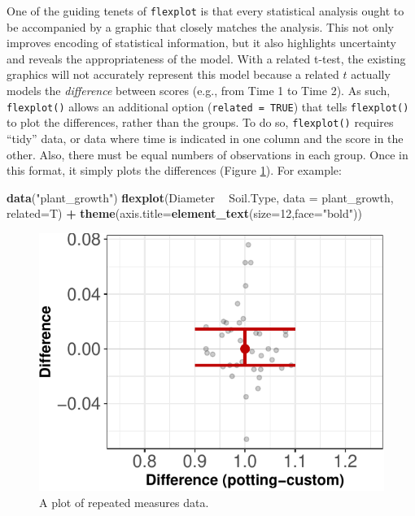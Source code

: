 \documentclass[
  doc]{apa6}
\newenvironment{Shaded}{\begin{snugshade}}{\end{snugshade}}
\newcommand{\DataTypeTok}[1]{\textcolor[rgb]{0.13,0.29,0.53}{#1}}
\newcommand{\DecValTok}[1]{\textcolor[rgb]{0.00,0.00,0.81}{#1}}
\newcommand{\KeywordTok}[1]{\textcolor[rgb]{0.13,0.29,0.53}{\textbf{#1}}}
\newcommand{\NormalTok}[1]{#1}
\newcommand{\OperatorTok}[1]{\textcolor[rgb]{0.81,0.36,0.00}{\textbf{#1}}}
\newcommand{\StringTok}[1]{\textcolor[rgb]{0.31,0.60,0.02}{#1}}
\begin{document}
One of the guiding tenets of \texttt{flexplot} is that every statistical analysis ought to be accompanied by a graphic that closely matches the analysis. This not only improves encoding of statistical information, but it also highlights uncertainty and reveals the appropriateness of the model. With a related t-test, the existing graphics will not accurately represent this model because a related \(t\) actually models the \emph{difference} between scores (e.g., from Time 1 to Time 2). As such, \texttt{flexplot()} allows an additional option (\texttt{related\ =\ TRUE}) that tells \texttt{flexplot()} to plot the differences, rather than the groups. To do so, \texttt{flexplot()} requires \enquote{tidy} data, or data where time is indicated in one column and the score in the other. Also, there must be equal numbers of observations in each group. Once in this format, it simply plots the differences (Figure \ref{fig:plant}). For example:

\begin{Shaded}
\begin{Highlighting}[]
\KeywordTok{data}\NormalTok{(}\StringTok{"plant_growth"}\NormalTok{)}
\KeywordTok{flexplot}\NormalTok{(Diameter }\OperatorTok{~}\StringTok{ }\NormalTok{Soil.Type, }\DataTypeTok{data =}\NormalTok{ plant_growth, }\DataTypeTok{related=}\NormalTok{T) }\OperatorTok{+}
\StringTok{  }\KeywordTok{theme}\NormalTok{(}\DataTypeTok{axis.title=}\KeywordTok{element_text}\NormalTok{(}\DataTypeTok{size=}\DecValTok{12}\NormalTok{,}\DataTypeTok{face=}\StringTok{"bold"}\NormalTok{))}
\end{Highlighting}
\end{Shaded}

\begin{figure}
\centering
\includegraphics{flexplot_psychmeth_files/figure-latex/plant-1.pdf}
\caption{\label{fig:plant}A plot of repeated measures data.\label{fig:plant}}
\end{figure}
\end{document}
